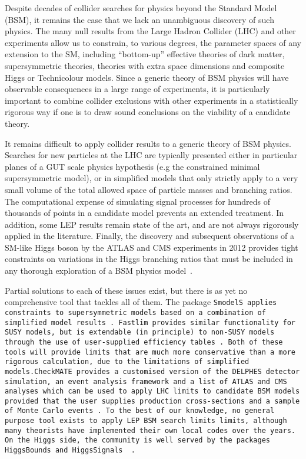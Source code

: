 Despite decades of collider searches for physics beyond the Standard Model (BSM), it remains the case that we lack an unambiguous discovery of such physics. The many null results from the Large Hadron Collider (LHC) and other experiments allow us to constrain, to various degrees, the parameter spaces of any extension to the SM, including ``bottom-up'' effective theories of dark matter, supersymmetric theories, theories with extra space dimensions and composite Higgs or Technicolour models. Since a generic theory of BSM physics will have observable consequences in a large range of experiments, it is particularly important to combine collider exclusions with other experiments in a statistically rigorous way if one is to draw sound conclusions on the viability of a candidate theory.

It remains difficult to apply collider results to a generic theory of BSM physics. Searches for new particles at the LHC are typically presented either in particular planes of a GUT scale physics hypothesis (e.g the constrained minimal supersymmetric model), or in simplified models that only strictly apply to a very small volume of the total allowed space of particle masses and branching ratios. The computational expense of simulating signal processes for hundreds of thousands of points in a candidate model prevents an extended treatment. In addition, some LEP results remain state of the art, and are not always rigorously applied in the literature. Finally, the discovery and subsequent observations of a SM-like Higgs boson by the ATLAS and CMS experiments in 2012 provides tight constraints on variations in the Higgs branching ratios that must be included in any thorough exploration of a BSM physics model~\cite{Aad:2012tfa,Chatrchyan:2012xdj}.

Partial solutions to each of these issues exist, but there is as yet no comprehensive tool that tackles all of them. The package \tt SmodelS \rm applies constraints to supersymmetric models based on a combination of simplified model results~\cite{Kraml:2013mwa}. \tt Fastlim \rm provides similar functionality for SUSY models, but is extendable (in principle) to non-SUSY models through the use of user-supplied efficiency tables~\cite{Papucci:2014rja}. Both of these tools will provide limits that are much more conservative than a more rigorous calculation, due to the limitations of simplified models.\tt CheckMATE \rm provides a customised version of the \tt DELPHES \rm detector simulation, an event analysis framework and a list of ATLAS and CMS analyses which can be used to apply LHC limits to candidate BSM models provided that the user supplies production cross-sections and a sample of Monte Carlo events~\cite{Drees:2013wra,deFavereau:2013fsa,Ovyn:2009tx}.  To the best of our knowledge, no general purpose tool exists to apply LEP BSM search limits limits, although many theorists have implemented their own local codes over the years. On the Higgs side, the community is well served by the packages \tt HiggsBounds \rm and \tt HiggsSignals \rm~\cite{Bechtle:2008jh,Bechtle:2011sb,Bechtle:2013wla}. 

